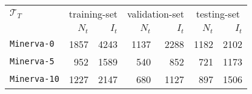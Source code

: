\begin{tabular}{l|rr|rr|rr} \hline
	$\mathcal{T}_T$ &  \multicolumn{2}{c}{training-set} & \multicolumn{2}{|c|}{validation-set} & \multicolumn{2}{c}{testing-set}\\
& $N_t$ & $I_t$ & $N_t$ & $I_t$ & $N_t$ & $I_t$ \\\hline \hline
\texttt{Minerva-0} & 1857 & 4243 & 1137 & 2288 & 1182 & 2102 \\
\texttt{Minerva-5} & 952 & 1589 & 540 & 852 & 721 & 1173\\
\texttt{Minerva-10} & 1227 & 2147  & 680 & 1127 & 897 & 1506 \\
\hline

\end{tabular}
